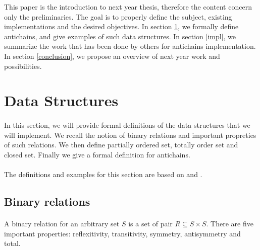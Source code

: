 \documentclass[11pt,a4paper]{article}
\theoremstyle{definition}
\begin{document}
This paper is the introduction to next year thesis, therefore
the content concern only the preliminaries. The goal is to
properly define the subject,
existing implementations and the desired objectives.
In section \ref{data_structures}, we formally define antichains,
and give examples of such data structures. In section \ref{impl},
we summarize the work that has been done by others
for antichains implementation. In section \ref{conclusion}, we propose
an overview of next year work and possibilities.

\newpage

\section{Data Structures}

\label{data_structures}

\paragraph{}

In this section, we will provide formal definitions of the data
structures that we will implement. We recall the notion of binary relations
and important propreties of such relations.
We then define partially ordered set, totally order set and closed set.
Finally we give a formal definition for antichains.

\paragraph{}

The definitions and examples for this section are based on \cite{bohy_phd}
and \cite{maquet_phd}.


\subsection{Binary relations}

\paragraph{}

A binary relation for an arbitrary set $S$ is
a set of pair $R \subseteq S \times S$.
There are five important properties: reflexitivity, transitivity,
symmetry, antisymmetry and total.

\paragraph{}
\end{document}
